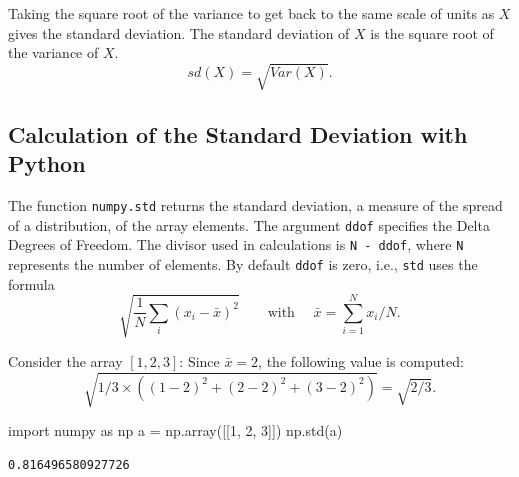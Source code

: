 \documentclass[
  letterpaper,
  DIV=11,
  numbers=noendperiod]{scrreprt}
\newenvironment{Shaded}{\begin{snugshade}}{\end{snugshade}}
\newcommand{\DecValTok}[1]{\textcolor[rgb]{0.68,0.00,0.00}{#1}}
\newcommand{\ImportTok}[1]{\textcolor[rgb]{0.00,0.46,0.62}{#1}}
\newcommand{\NormalTok}[1]{\textcolor[rgb]{0.00,0.23,0.31}{#1}}
\newcommand{\OperatorTok}[1]{\textcolor[rgb]{0.37,0.37,0.37}{#1}}
\begin{document}
Taking the square root of the variance to get back to the same scale of
units as \(X\) gives the standard deviation. The standard deviation of
\(X\) is the square root of the variance of \(X\). \begin{equation}
sd(X) = \sqrt{Var(X)}.
\end{equation}

\hypertarget{calculation-of-the-standard-deviation-with-python}{%
\subsection{Calculation of the Standard Deviation with
Python}\label{calculation-of-the-standard-deviation-with-python}}

The function \texttt{numpy.std} returns the standard deviation, a
measure of the spread of a distribution, of the array elements. The
argument \texttt{ddof} specifies the Delta Degrees of Freedom. The
divisor used in calculations is \texttt{N\ -\ ddof}, where \texttt{N}
represents the number of elements. By default \texttt{ddof} is zero,
i.e., \texttt{std} uses the formula
\begin{equation}  \sqrt{  \frac{1}{N} \sum_i \left( x_i - \bar{x} \right)^2  } \qquad \text{with } \quad \bar{x} = \sum_{i=1}^N x_i /N. \end{equation}

\begin{tcolorbox}[enhanced jigsaw, opacityback=0, left=2mm, title=\textcolor{quarto-callout-note-color}{\faInfo}\hspace{0.5em}{Example: Standard Deviation with Python}, bottomrule=.15mm, titlerule=0mm, arc=.35mm, leftrule=.75mm, colbacktitle=quarto-callout-note-color!10!white, bottomtitle=1mm, opacitybacktitle=0.6, coltitle=black, colframe=quarto-callout-note-color-frame, toprule=.15mm, breakable, colback=white, toptitle=1mm, rightrule=.15mm]

Consider the array \([1,2,3]\): Since \(\bar{x} = 2\), the following
value is computed:
\[ \sqrt{1/3 \times \left( (1-2)^2 + (2-2)^2 + (3-2)^2  \right)} = \sqrt{2/3}.\]

\begin{Shaded}
\begin{Highlighting}[]
\ImportTok{import}\NormalTok{ numpy }\ImportTok{as}\NormalTok{ np}
\NormalTok{a }\OperatorTok{=}\NormalTok{ np.array([[}\DecValTok{1}\NormalTok{, }\DecValTok{2}\NormalTok{, }\DecValTok{3}\NormalTok{]])}
\NormalTok{np.std(a)}
\end{Highlighting}
\end{Shaded}

\begin{verbatim}
0.816496580927726
\end{verbatim}

\end{tcolorbox}
\end{document}
